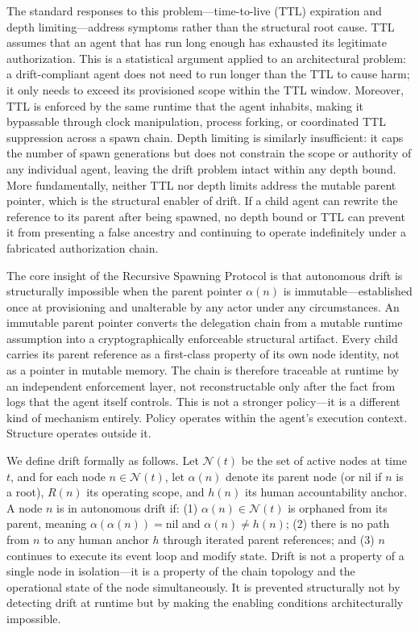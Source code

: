 The standard responses to this problem—time-to-live (TTL) expiration and depth limiting—address symptoms rather than the structural root cause. TTL assumes that an agent that has run long enough has exhausted its legitimate authorization. This is a statistical argument applied to an architectural problem: a drift-compliant agent does not need to run longer than the TTL to cause harm; it only needs to exceed its provisioned scope within the TTL window. Moreover, TTL is enforced by the same runtime that the agent inhabits, making it bypassable through clock manipulation, process forking, or coordinated TTL suppression across a spawn chain. Depth limiting is similarly insufficient: it caps the number of spawn generations but does not constrain the scope or authority of any individual agent, leaving the drift problem intact within any depth bound. More fundamentally, neither TTL nor depth limits address the mutable parent pointer, which is the structural enabler of drift. If a child agent can rewrite the reference to its parent after being spawned, no depth bound or TTL can prevent it from presenting a false ancestry and continuing to operate indefinitely under a fabricated authorization chain.

The core insight of the Recursive Spawning Protocol is that autonomous drift is structurally impossible when the parent pointer $\alpha(n)$ is immutable—established once at provisioning and unalterable by any actor under any circumstances. An immutable parent pointer converts the delegation chain from a mutable runtime assumption into a cryptographically enforceable structural artifact. Every child carries its parent reference as a first-class property of its own node identity, not as a pointer in mutable memory. The chain is therefore traceable at runtime by an independent enforcement layer, not reconstructable only after the fact from logs that the agent itself controls. This is not a stronger policy—it is a different kind of mechanism entirely. Policy operates within the agent's execution context. Structure operates outside it.

We define drift formally as follows. Let $\mathcal{N}(t)$ be the set of active nodes at time $t$, and for each node $n \in \mathcal{N}(t)$, let $\alpha(n)$ denote its parent node (or $\text{nil}$ if $n$ is a root), $R(n)$ its operating scope, and $h(n)$ its human accountability anchor. A node $n$ is in autonomous drift if: (1) $\alpha(n) \in \mathcal{N}(t)$ is orphaned from its parent, meaning $\alpha(\alpha(n)) = \text{nil}$ and $\alpha(n) \neq h(n)$; (2) there is no path from $n$ to any human anchor $h$ through iterated parent references; and (3) $n$ continues to execute its event loop and modify state. Drift is not a property of a single node in isolation—it is a property of the chain topology and the operational state of the node simultaneously. It is prevented structurally not by detecting drift at runtime but by making the enabling conditions architecturally impossible.

